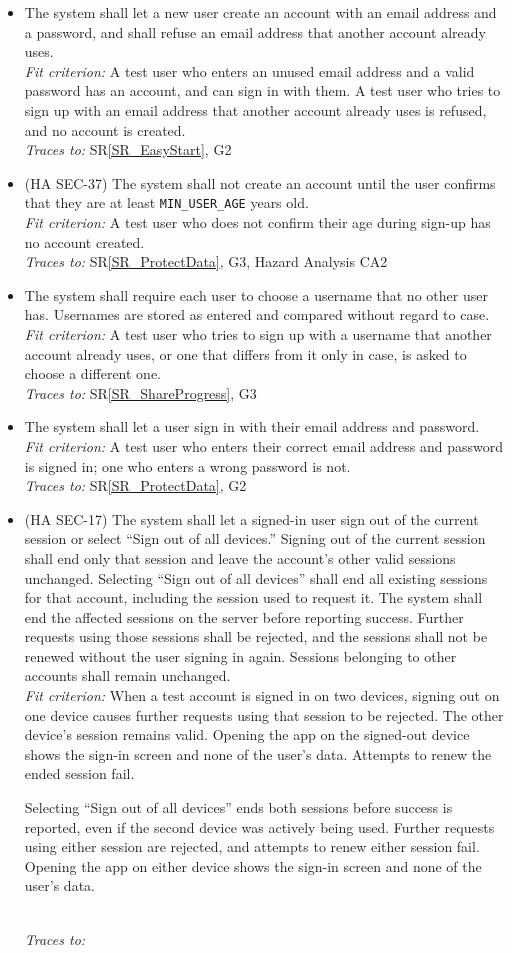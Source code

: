 \documentclass[12pt]{article}
\newcommand{\srref}[1]{SR\ref{#1}}
\newcounter{reqnum} %
\newcommand{\freq}[4]{%
  \item[FR\refstepcounter{reqnum}\thereqnum \label{#1}:] #2\\
  \textit{Fit criterion:} #3\\
  \textit{Traces to:} #4}
\begin{document}
\noindent \begin{itemize}
\freq{FR_AcctCreate}
  {The system shall let a new user create an account with an email address and
  a password, and shall refuse an email address that another account already
  uses.}
  {A test user who enters an unused email address and a valid password has an
  account, and can sign in with them. A test user who tries to sign up with an
  email address that another account already uses is refused, and no account is
  created.}
  {\srref{SR_EasyStart}, G2}
\freq{FR_AcctAgeConfirm}
  {(HA SEC-37) The system shall not create an account until the user confirms
  that they are at least \texttt{MIN\_USER\_AGE} years old.}
  {A test user who does not confirm their age during sign-up has no account
  created.}
  {\srref{SR_ProtectData}, G3, Hazard Analysis CA2}
\freq{FR_AcctUsername}
  {The system shall require each user to choose a username that no other user
  has. Usernames are stored as entered and compared without regard to case.}
  {A test user who tries to sign up with a username that another account
  already uses, or one that differs from it only in case, is asked to choose a
  different one.}
  {\srref{SR_ShareProgress}, G3}
\freq{FR_AcctSignIn}
  {The system shall let a user sign in with their email address and password.}
  {A test user who enters their correct email address and password is signed
  in; one who enters a wrong password is not.}
  {\srref{SR_ProtectData}, G2}
\freq{FR_AcctSignOut}
  {(HA SEC-17) The system shall let a signed-in user sign out of the current
  session or select ``Sign out of all devices.'' Signing out of the current
  session shall end only that session and leave the account's other valid
  sessions unchanged. Selecting ``Sign out of all devices'' shall end all
  existing sessions for that account, including the session used to request
  it. The system shall end the affected sessions on the server before
  reporting success. Further requests using those sessions shall be rejected,
  and the sessions shall not be renewed without the user signing in again.
  Sessions belonging to other accounts shall remain unchanged.}
  {When a test account is signed in on two devices, signing out on one
  device causes further requests using that session to be rejected.
  The other device's session remains valid. Opening the app on the
  signed-out device shows the sign-in screen and none of the user's data.
  Attempts to renew the ended session fail.

  Selecting ``Sign out of all devices'' ends both sessions before success
  is reported, even if the second device was actively being used.
  Further requests using either session are rejected, and attempts to
  renew either session fail. Opening the app on either device shows
  the sign-in screen and none of the user's data.

}
\end{itemize}
\end{document}
